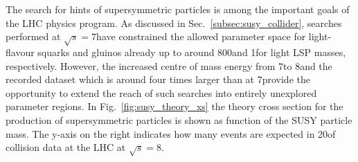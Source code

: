 The search for hints of supersymmetric particles is among the important goals of the LHC physics program. As discussed in Sec.~\ref{subsec:susy_collider}, searches performed at $\sqrt{s} = 7$\tev have constrained the allowed parameter space for light-flavour squarks and gluinos already up to around 800\gev and 1\tev for light LSP masses, respectively. However, the increased centre of mass energy from 7\tev to 8\tev and the recorded dataset which is around four times larger than at 7\tev provide the opportunity to extend the reach of such searches into entirely unexplored parameter regions. In Fig.~\ref{fig:susy_theory_xs} the theory cross section for the production of supersymmetric particles is shown as function of the SUSY particle mass. The y-axis on the right indicates how many events are expected in 20\fbinv of \pp collision data at the LHC at $\sqrt{s}=8$\tev. \\


